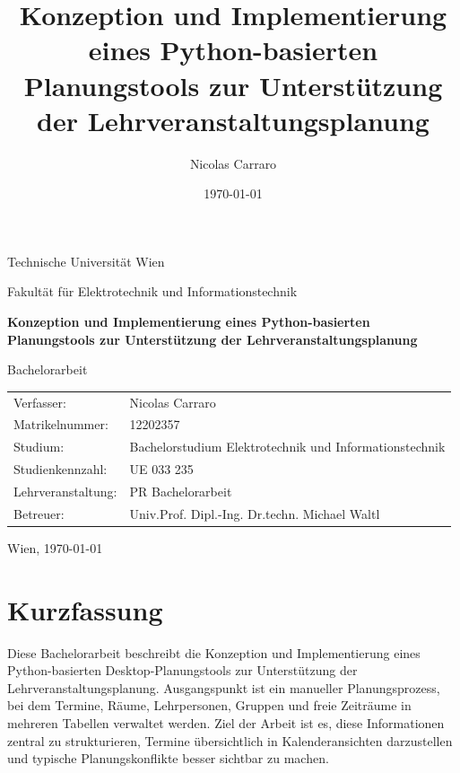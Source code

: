 \documentclass[12pt,a4paper]{article}
\title{Konzeption und Implementierung eines Python-basierten Planungstools zur Unterstützung der Lehrveranstaltungsplanung}
\author{Nicolas Carraro}
\date{\today}
\begin{document}
\hypersetup{pageanchor=false}
\begin{titlepage}
\centering

{\Large Technische Universität Wien\par}
\vspace{0.5cm}
{\large Fakultät für Elektrotechnik und Informationstechnik\par}
\vspace{2cm}

{\LARGE\bfseries Konzeption und Implementierung eines Python-basierten Planungstools zur Unterstützung der Lehrveranstaltungsplanung\par}

\vspace{2cm}
{\Large Bachelorarbeit\par}

\vfill

\begin{tabular}{ll}
Verfasser: & Nicolas Carraro \\
Matrikelnummer: & 12202357 \\
Studium: & Bachelorstudium Elektrotechnik und Informationstechnik \\
Studienkennzahl: & UE 033 235 \\
Lehrveranstaltung: & PR Bachelorarbeit \\
Betreuer: & Univ.Prof. Dipl.-Ing. Dr.techn. Michael Waltl \\
\end{tabular}

\vfill

Wien, \today

\end{titlepage}
\hypersetup{pageanchor=true}


\section*{Kurzfassung}

Diese Bachelorarbeit beschreibt die Konzeption und Implementierung eines Python-basierten Desktop-Planungstools zur Unterstützung der Lehrveranstaltungsplanung. Ausgangspunkt ist ein manueller Planungsprozess, bei dem Termine, Räume, Lehrpersonen, Gruppen und freie Zeiträume in mehreren Tabellen verwaltet werden. Ziel der Arbeit ist es, diese Informationen zentral zu strukturieren, Termine übersichtlich in Kalenderansichten darzustellen und typische Planungskonflikte besser sichtbar zu machen.
\end{document}
